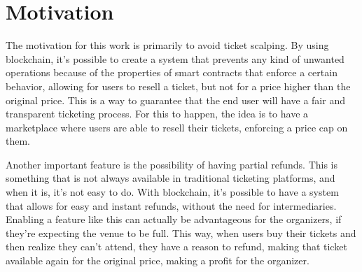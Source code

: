\section{Motivation}
\label{sec:motivation}

The motivation for this work is primarily to avoid ticket scalping. By using
blockchain, it's possible to create a system that prevents any kind of unwanted
operations because of the properties of smart contracts that enforce a certain
behavior, allowing for users to resell a ticket, but not for a price higher
than the original price. This is a way to guarantee that the end user will have
a fair and transparent ticketing process. For this to happen, the idea is to
have a marketplace where users are able to resell their tickets, enforcing a
price cap on them.

Another important feature is the possibility of having partial refunds. This is
something that is not always available in traditional ticketing platforms, and
when it is, it's not easy to do. With blockchain, it's possible to have a
system that allows for easy and instant refunds, without the need for
intermediaries. Enabling a feature like this can actually be advantageous for
the organizers, if they're expecting the venue to be full. This way, when users
buy their tickets and then realize they can't attend, they have a reason to
refund, making that ticket available again for the original price, making a
profit for the organizer.
